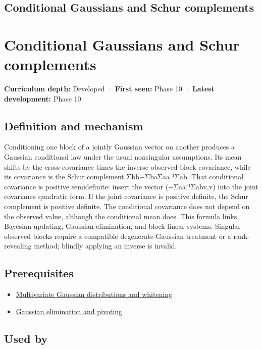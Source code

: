 \hypertarget{appendix-f0437ea55a47}{}
\section*{Conditional Gaussians and Schur complements}
\chapter{Conditional Gaussians and Schur complements}\label{appendix-f0437ea55a47-conditional-gaussians-and-schur-complements}

\textbf{Curriculum depth:} Developed · \textbf{First seen:} Phase 10 · \textbf{Latest development:} Phase 10

\section{Definition and mechanism}\label{appendix-f0437ea55a47-definition-and-mechanism}

Conditioning one block of a jointly Gaussian vector on another produces a Gaussian conditional law under the usual nonsingular assumptions. Its mean shifts by the cross-covariance times the inverse observed-block covariance, while its covariance is the Schur complement Σbb−ΣbaΣaa⁻¹Σab. That conditional covariance is positive semidefinite: insert the vector (−Σaa⁻¹Σabv,v) into the joint covariance quadratic form. If the joint covariance is positive definite, the Schur complement is positive definite. The conditional covariance does not depend on the observed value, although the conditional mean does. This formula links Bayesian updating, Gaussian elimination, and block linear systems. Singular observed blocks require a compatible degenerate-Gaussian treatment or a rank-revealing method; blindly applying an inverse is invalid.

\section{Prerequisites}\label{appendix-f0437ea55a47-prerequisites}

\begin{itemize}
\tightlist
\item
  \hyperref[appendix-12bbe185dbe5]{Multivariate Gaussian distributions and whitening}
\item
  \hyperref[appendix-f6e77f4a200f]{Gaussian elimination and pivoting}
\end{itemize}

\section{Used by}\label{appendix-f0437ea55a47-used-by}

